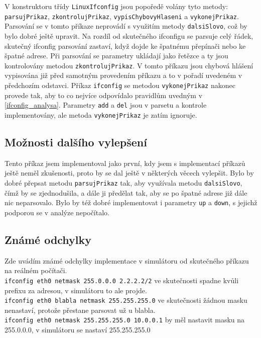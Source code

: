 V konstruktoru třídy \verb|LinuxIfconfig| jsou popoředě volány tyto metody: \verb|parsujPrikaz|, \verb|zkontrolujPrikaz|, \verb|vypisChybovyHlaseni| a \verb|vykonejPrikaz|. Parsování se v tomto příkaze neprovádí s využitím metody \verb|dalsiSlovo|, což by bylo dobré ještě upravit. Na rozdíl od skutečného ifconfigu se parsuje celý řádek, skutečný ifconfig parsování zastaví, když dojde ke špatnému přepínači nebo ke špatné adrese. Při parsování se parametry ukládají jako řetězce a ty jsou kontrolovány metodou \verb|zkontrolujPrikaz|. V tomto příkazu jsou chybová hlášení vypisována již před samotným provedením příkazu a to v pořadí uvedeném v předchozím odstavci. Příkaz \verb|ifconfig| se metodou \verb|vykonejPrikaz| nakonec provede tak, aby to co nejvíce odpovídalo pravidlům uvedným v \ref{ifconfig_analysa}. Parametry \verb|add| a \verb|del| jsou v parsetu a kontrole implementovány, ale metoda \verb|vykonejPrikaz| je zatím ignoruje.


\subsection{Možnosti dalšího vylepšení}

Tento příkaz jsem implementoval jako první, kdy jsem s implementací příkazů ještě neměl zkušenosti, proto by se dal ještě v některých věcech vylepšit. Bylo by dobré přepsat metodu \verb|parsujPrikaz| tak, aby využívala metodu \verb|dalsiSlovo|, čímž by se zjednodušila, a dále ji předělat tak, aby se po špatné adrese již dále nic neparsovalo. Bylo by též dobré implementovat i parametry \verb|up| a \verb|down|, s jejichž podporou se v analýze nepočítalo.


\subsection{Známé odchylky}

Zde uvádím známé odchylky implementace v simulátoru od skutečného příkazu na reálném počítači.\\
\verb|ifconfig eth0 netmask 255.0.0.0 2.2.2.2/2| ve skutečnosti spadne kvůli prefixu za adresou, v simulátoru to ale projde.\\
\verb|ifconfig eth0 blabla netmask 255.255.255.0| ve skutečnosti žádnou masku nenastaví, protože přestane parsovat už u blabla.\\
\verb|ifconfig eth0 netmask 255.255.255.0 10.0.0.1| by měl nastavit masku na 255.0.0.0, v simulátoru se nastaví 255.255.255.0




